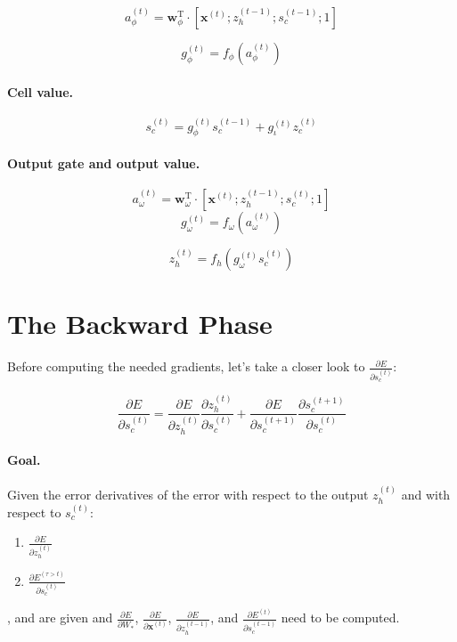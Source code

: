 \documentclass[11pt]{article}
\begin{document}
$$a_{\phi}^{(t)} = \mathbf{w}_{\phi}^{\text{T}} \cdot \left[\mathbf{x}^{(t)}; z_{h}^{(t-1)}; s_c^{(t-1)}; 1\right]$$

$$g_{\phi}^{(t)} = f_{\phi}\left(a_{\phi}^{(t)}\right)$$

\paragraph{Cell value.}

$$s_c^{(t)} = g_{\phi}^{(t)} s_c^{(t-1)} + g_{\iota}^{(t)} z_{c}^{(t)}$$

\paragraph{Output gate and output value.}

$$a_{\omega}^{(t)} = \mathbf{w}_{\omega}^{\text{T}} \cdot \left[\mathbf{x}^{(t)}; z_{h}^{(t-1)}; s_c^{(t)}; 1\right]$$
$$g_{\omega}^{(t)} = f_{\omega}\left(a_{\omega}^{(t)}\right)$$

$$z_h^{(t)} = f_h\left(g_{\omega}^{(t)} s_c^{(t)}\right)$$

\section{The Backward Phase}

\begin{center}

\end{center}

Before computing the needed gradients, let's take a closer look to $\displaystyle \frac{\partial E}{\partial s_c^{(t)}}$:

\begin{equation}
    \displaystyle\frac{\partial E}{\partial s_c^{(t)}} =
    \displaystyle\frac{\partial E}{\partial z_h^{(t)}}
    \displaystyle\frac{\partial z_h^{(t)}}{\partial s_c^{(t)}} +
    \displaystyle\frac{\partial E}{\partial s_c^{(t+1)}}
    \displaystyle\frac{\partial s_c^{(t+1)}}{\partial s_c^{(t)}}
\end{equation}

\paragraph{Goal.}
Given the error derivatives of the error with respect to the output $z_h^{(t)}$ and with respect to $s_c^{(t)}$: \begin{enumerate}
    \item $\displaystyle\frac{\partial E}{\partial z_h^{(t)}}$
    \item $\displaystyle\frac{\partial E^{(\tau > t)}}{\partial s_c^{(t)}}$
\end{enumerate}, and  are given and $\displaystyle \frac{\partial E}{\partial W_{*}}$, $\displaystyle \frac{\partial E}{\partial \mathbf{x}^{(t)}}$, $\displaystyle \frac{\partial E}{\partial z_{h}^{(t-1)}}$, and $\displaystyle \frac{\partial E^{(t)}}{\partial s_c^{(t-1)}}$ need to be computed.
\end{document}

